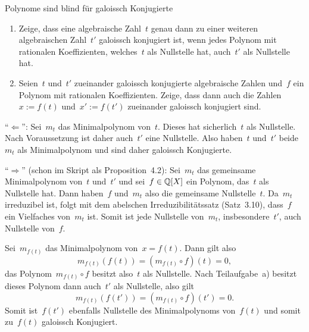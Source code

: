 \documentclass{algblatt}
\begin{document}
\begin{aufgabe}{Polynome sind blind für galoissch Konjugierte}
\begin{enumerate}
\item Zeige, dass eine algebraische Zahl~$t$ genau dann zu einer weiteren
algebraischen Zahl~$t'$ galoissch konjugiert ist, wenn jedes Polynom mit
rationalen Koeffizienten, welches~$t$ als Nullstelle hat, auch~$t'$ als
Nullstelle hat.
\item Seien~$t$ und~$t'$ zueinander galoissch konjugierte algebraische Zahlen
und~$f$ ein Polynom mit rationalen Koeffizienten. Zeige, dass dann auch die
Zahlen~$x := f(t)$ und~$x' := f(t')$ zueinander galoissch konjugiert sind.
\end{enumerate}

\begin{loesungE}
\item "`$\Longleftarrow$"': Sei~$m_t$ das Minimalpolynom von~$t$. Dieses hat
sicherlich~$t$ als Nullstelle. Nach Voraussetzung ist daher auch~$t'$ eine
Nullstelle. Also haben~$t$ und~$t'$ beide~$m_t$ als Minimalpolynom und sind
daher galoissch Konjugierte.

"`$\Longrightarrow$"' (schon im Skript als Proposition~4.2): Sei~$m_t$ das
gemeinsame Minimalpolynom von~$t$ und~$t'$
und sei~$f \in \mathbb{Q}[X]$ ein Polynom, das~$t$ als Nullstelle hat. Dann
haben~$f$ und~$m_t$ also die gemeinsame Nullstelle~$t$. Da~$m_t$ irreduzibel
ist, folgt mit dem abelschen Irreduzibilitätssatz (Satz~3.10), dass~$f$ ein
Vielfaches von~$m_t$ ist. Somit ist jede Nullstelle von~$m_t$,
insbesondere~$t'$, auch Nullstelle von~$f$.

\item Sei~$m_{f(t)}$ das Minimalpolynom von~$x = f(t)$. Dann gilt also
\[ m_{f(t)}(f(t)) = (m_{f(t)} \circ f)(t) = 0, \]
das Polynom~$m_{f(t)} \circ f$ besitzt also~$t$ als Nullstelle. Nach
Teilaufgabe~a) besitzt dieses Polynom dann auch~$t'$ als Nullstelle, also gilt
\[ m_{f(t)}(f(t')) = (m_{f(t)} \circ f)(t') = 0. \]
Somit ist~$f(t')$ ebenfalls Nullstelle des Minimalpolynoms von~$f(t)$ und somit
zu~$f(t)$ galoissch Konjugiert.
\end{loesungE}
\end{aufgabe}
\end{document}
